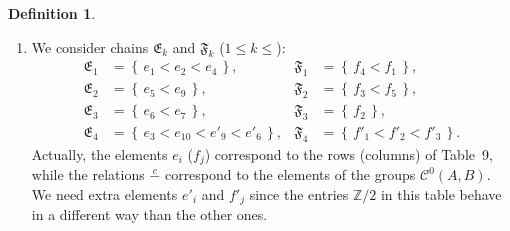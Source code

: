 \documentclass[12pt,a4paper]{amsart}
\theoremstyle{definition}
\newtheorem{defin}[theorem]{Definition}
\theoremstyle{remark}
\numberwithin{equation}{section}
\begin{document}
  \begin{defin}
    \begin{enumerate}
    \item  We consider chains ${\mathfrak E}_k$ and ${\mathfrak F}_k$ ($1\le k\le $):
      \begin{align*}
	{\mathfrak E}_1&={\left\{\,{e_1<e_2<e_4}\,\right\}}, &{\mathfrak F}_1&={\left\{\,{f_4<f_1}\,\right\}},\\
	{\mathfrak E}_2&={\left\{\,{e_5<e_9}\,\right\}}, &{\mathfrak F}_2&={\left\{\,{f_3<f_5}\,\right\}},\\
	{\mathfrak E}_3&={\left\{\,{e_6<e_7}\,\right\}}, &{\mathfrak F}_3&={\left\{\,{f_2}\,\right\}},\\
	{\mathfrak E}_4&={\left\{\,{e_3<e_{10}<e'_9<e'_6}\,\right\}}, &{\mathfrak F}_4&={\left\{\,{f'_1<f'_2<f'_3}\,\right\}}.
      \end{align*}
      Actually, the elements $e_i$ ($f_j$) correspond to the rows
  (columns) of Table~9, while the relations ${\stackrel{{c}}{-}}$ correspond to the
  elements of the groups ${\mathscr C}^0(A,B)$. We need extra elements $e'_i$
  and $f'_j$ since the entries ${\mathbb Z}/2$ in this table behave in a
  different way than the other ones. 


\end{enumerate}
\end{defin}
\end{document}
